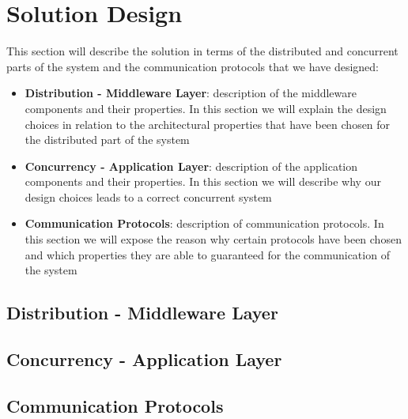 \section{Solution Design}

This section will describe the solution in terms of the distributed and concurrent parts of the system and the communication protocols that we have designed:

\begin{itemize}
\item \textbf{Distribution - Middleware Layer}: 
	description of the middleware components and their properties. In this section we will explain the design choices in relation to the architectural properties that have been chosen 
	for the distributed part of the system
\item \textbf{Concurrency - Application Layer}: 
	description of the application components and their properties. In this section we will describe why our design choices leads to a correct concurrent system 
\item \textbf{Communication Protocols}: 
	description of communication protocols. In this section we will expose the reason why certain protocols have been chosen and which properties they are able to guaranteed for 
	the communication of the system
\end{itemize}

\subsection{Distribution - Middleware Layer}

\subsection{Concurrency - Application Layer}

\subsection{Communication Protocols}

